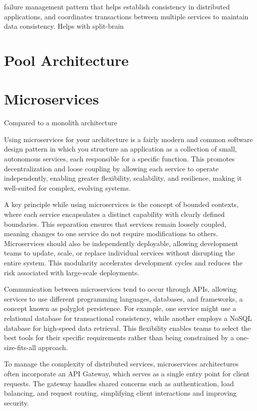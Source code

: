 \documentclass[]{final}
\begin{document}
failure management pattern that helps establish consistency in distributed
applications, and coordinates transactions between multiple services to
maintain data consistency. Helps with split-brain

\section{Pool Architecture}

\section{Microservices}
Compared to a monolith architecture

Using microservices for your architecture is a fairly modern and common software
design pattern in which you structure an application as a collection of small,
autonomous services, each responsible for a specific function. This promotes
decentralization and loose coupling by allowing each service to operate
independently, enabling greater flexibility, scalability, and resilience,
making it well-suited for complex, evolving systems.

A key principle while using microservices is the concept of bounded contexts,
where each service encapsulates a distinct capability with clearly defined
boundaries. This separation ensures that services remain loosely coupled,
meaning changes to one service do not require modifications to others.
Microservices should also be independently deployable, allowing development
teams to update, scale, or replace individual services without disrupting
the entire system. This modularity accelerates development cycles and
reduces the risk associated with large-scale deployments.

Communication between microservices tend to occur through APIs, allowing
services to use different programming languages, databases, and frameworks,
a concept known as polyglot persistence. For example, one service might use
a relational database for transactional consistency, while another employs a
NoSQL database for high-speed data retrieval. This flexibility enables
teams to select the best tools for their specific requirements rather
than being constrained by a one-size-fits-all approach.

To manage the complexity of distributed services, microservices architectures
often incorporate an API Gateway, which serves as a single entry point for
client requests. The gateway handles shared concerns such as authentication,
load balancing, and request routing, simplifying client interactions and
improving security.
\end{document}
